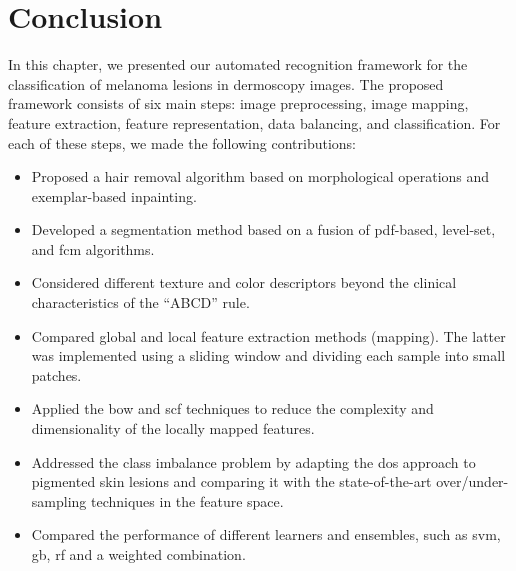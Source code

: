 \section{Conclusion}
\label{sec:chp3-sec7}
In this chapter, we presented our automated recognition framework for the classification of melanoma lesions in dermoscopy images.
The proposed framework consists of six main steps: image preprocessing, image mapping, feature extraction, feature representation, data balancing, and classification.
For each of these steps, we made the following contributions:
\begin{itemize}
	\item Proposed a hair removal algorithm based on morphological operations and exemplar-based inpainting.
	\item Developed a segmentation method based on a fusion of \ac{pdf}-based, level-set, and \ac{fcm} algorithms.
	\item Considered different texture and color descriptors beyond the clinical characteristics of the ``ABCD'' rule.
	\item Compared global and local feature extraction methods (mapping). The latter was implemented using a sliding window and dividing each sample into small patches.
	\item Applied the \ac{bow} and \ac{scf} techniques to reduce the complexity and dimensionality of the locally mapped features.
	\item Addressed the class imbalance problem by adapting the \acl{dos} approach to pigmented skin lesions and comparing it with the state-of-the-art over/under-sampling techniques in the feature space.
	\item Compared the performance of different learners and ensembles, such as \ac{svm}, \ac{gb}, \ac{rf} and a weighted combination.
\end{itemize}

